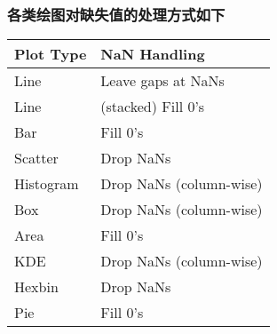 \hypertarget{ux7ed8ux5236ux591aux5217ux6570ux636eux7684ux997cux56fe}{%
\subsubsection{各类绘图对缺失值的处理方式如下}\label{ux7ed8ux5236ux591aux5217ux6570ux636eux7684ux997cux56fe}}

    \begin{longtable}[]{@{}ll@{}}
\toprule()
Plot Type & NaN Handling \\
\midrule()
\endhead
Line & Leave gaps at NaNs \\
Line & (stacked) Fill 0's \\
Bar & Fill 0's \\
Scatter & Drop NaNs \\
Histogram & Drop NaNs (column-wise) \\
Box & Drop NaNs (column-wise) \\
Area & Fill 0's \\
KDE & Drop NaNs (column-wise) \\
Hexbin & Drop NaNs \\
Pie & Fill 0's \\
\bottomrule()
\end{longtable}
